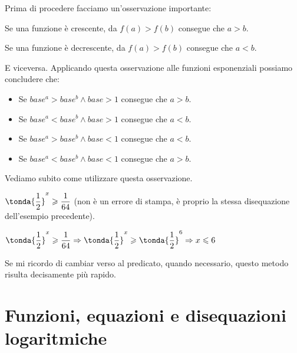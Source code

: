 Prima di procedere facciamo un'osservazione importante: 

Se una funzione è crescente, da \(f(a)>f(b)\) consegue che \(a>b\).

Se una funzione è decrescente, da \(f(a)>f(b)\) consegue che \(a<b\).

E viceversa. Applicando questa osservazione alle funzioni esponenziali possiamo 
concludere che:

\begin{itemize}
 \item Se \(base^a>base^b \wedge base>1\) consegue che \(a>b\).
 \item Se \(base^a<base^b \wedge base>1\) consegue che \(a<b\).
 \item Se \(base^a>base^b \wedge base<1\) consegue che \(a<b\).
 \item Se \(base^a<base^b \wedge base<1\) consegue che \(a>b\).
\end{itemize}

Vediamo subito come utilizzare questa osservazione.


\begin{esempio}
 \(\tonda{\dfrac{1}{2}}^x \geqslant \dfrac{1}{64}\) (non è un errore di stampa, 
è proprio la stessa disequazione dell'esempio precedente).
 
  \(\tonda{\dfrac{1}{2}}^x \geqslant \dfrac{1}{64} \Rightarrow
    \tonda{\dfrac{1}{2}}^x \geqslant \tonda{\dfrac{1}{2}}^6 \Rightarrow 
    x \leqslant 6\)
    
Se mi ricordo di cambiar verso al predicato, quando necessario, questo metodo 
risulta decisamente più rapido.
\end{esempio}


\section{Funzioni, equazioni e disequazioni logaritmiche}
\label{sec:esplog_logaritmiche}
















